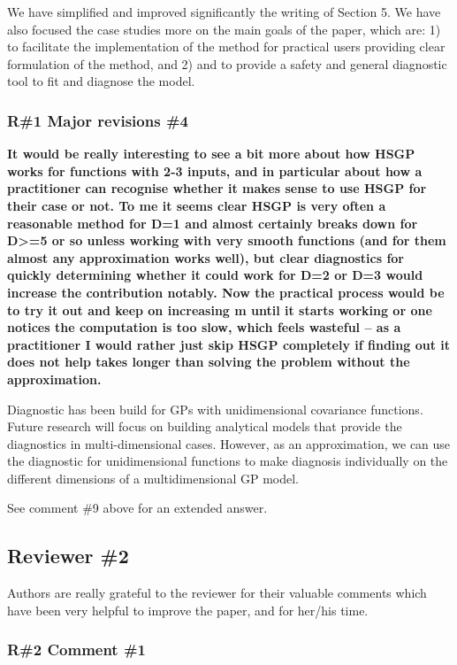 \documentclass[11pt]{report}
\begin{document}
We have simplified and improved significantly the writing of Section 5. We have also focused the case studies more on the main goals of the paper, which are: 1) to facilitate the implementation of the method for practical users providing clear formulation of the method, and 2) and to provide a safety and general diagnostic tool to fit and diagnose the model.
 

\subsubsection*{R\#1 Major revisions \#4}

\textbf{It would be really interesting to see a bit more about how HSGP works for functions with 2-3 inputs, and in particular about how a practitioner can recognise whether it makes sense to use HSGP for their case or not. To me it seems clear HSGP is very often a reasonable method for D=1 and almost certainly breaks down for D>=5 or so unless working with very smooth functions (and for them almost any approximation works well), but clear diagnostics for quickly determining whether it could work for D=2 or D=3 would increase the contribution notably. Now the practical process would be to try it out and keep on increasing m until it starts working or one notices the computation is too slow, which feels wasteful -- as a practitioner I would rather just skip HSGP completely if finding out it does not help takes longer than solving the problem without the approximation.}

Diagnostic has been build for GPs with unidimensional covariance functions. Future research will focus on building analytical models that provide the diagnostics in multi-dimensional cases. However, as an approximation, we can use the diagnostic for unidimensional functions to make diagnosis individually on the different dimensions of a multidimensional GP model. 

See comment \#9 above for an extended answer.

\noindent \hdashrule{12.5cm}{0.2pt}{2mm 1pt}

\subsection*{Reviewer \#2}

Authors are really grateful to the reviewer for their valuable comments which have been very helpful to improve the paper, and for her/his time.

\subsubsection*{R\#2 Comment \#1}
\end{document}
